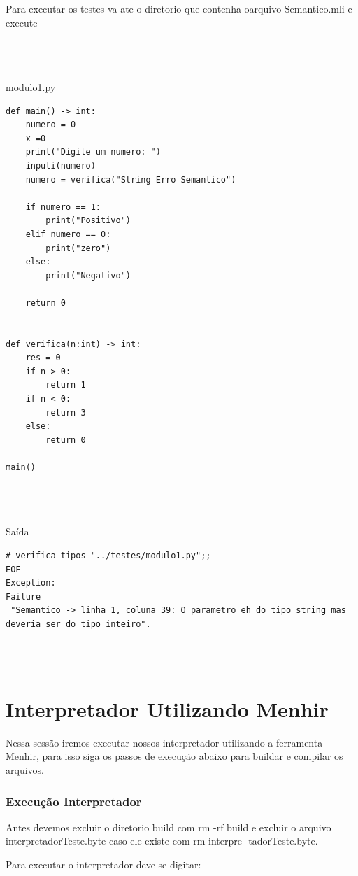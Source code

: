 \documentclass{article}
\begin{document}
Para executar os testes va ate o diretorio que contenha oarquivo Semantico.mli e execute


\\\\\\modulo1.py
\begin{lstlisting}
def main() -> int:
	numero = 0
	x =0
	print("Digite um numero: ")
	inputi(numero)
	numero = verifica("String Erro Semantico")

	if numero == 1:
		print("Positivo")
	elif numero == 0:
		print("zero")
	else:
		print("Negativo")

	return 0
	

def verifica(n:int) -> int:
	res = 0
	if n > 0:
		return 1
	if n < 0:
		return 3
	else:
		return 0

main()
\end{lstlisting}

\\\\\\Saída
\begin{lstlisting}
# verifica_tipos "../testes/modulo1.py";;
EOF
Exception:
Failure
 "Semantico -> linha 1, coluna 39: O parametro eh do tipo string mas deveria ser do tipo inteiro".

\end{lstlisting}\\
\

\section{Interpretador Utilizando Menhir}
Nessa sessão iremos executar nossos interpretador utilizando a ferramenta Menhir, para isso siga os passos de execução abaixo para buildar e compilar os arquivos.

\subsubsection{Execução Interpretador}
Antes devemos excluir o diretorio build com rm -rf build
e excluir o arquivo interpretadorTeste.byte caso ele existe com rm interpre-
tadorTeste.byte.

Para executar o interpretador deve-se digitar:\\\\
\\\\
\\\\
\end{document}
